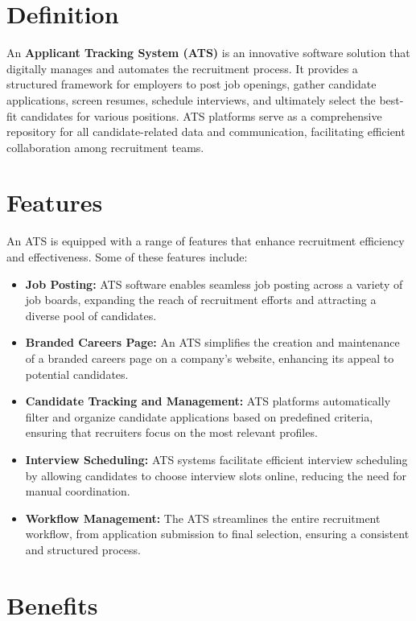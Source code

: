 \documentclass[
]{book}
\begin{document}
\hypertarget{definition}{%
\section{Definition}\label{definition}}

An \textbf{Applicant Tracking System (ATS)} is an innovative software solution that digitally manages and automates the recruitment process. It provides a structured framework for employers to post job openings, gather candidate applications, screen resumes, schedule interviews, and ultimately select the best-fit candidates for various positions. ATS platforms serve as a comprehensive repository for all candidate-related data and communication, facilitating efficient collaboration among recruitment teams.

\hypertarget{features}{%
\section{Features}\label{features}}

An ATS is equipped with a range of features that enhance recruitment efficiency and effectiveness. Some of these features include:

\begin{itemize}
\item
  \textbf{Job Posting:} ATS software enables seamless job posting across a variety of job boards, expanding the reach of recruitment efforts and attracting a diverse pool of candidates.
\item
  \textbf{Branded Careers Page:} An ATS simplifies the creation and maintenance of a branded careers page on a company's website, enhancing its appeal to potential candidates.
\item
  \textbf{Candidate Tracking and Management:} ATS platforms automatically filter and organize candidate applications based on predefined criteria, ensuring that recruiters focus on the most relevant profiles.
\item
  \textbf{Interview Scheduling:} ATS systems facilitate efficient interview scheduling by allowing candidates to choose interview slots online, reducing the need for manual coordination.
\item
  \textbf{Workflow Management:} The ATS streamlines the entire recruitment workflow, from application submission to final selection, ensuring a consistent and structured process.
\end{itemize}

\hypertarget{benefits}{%
\section{Benefits}\label{benefits}}
\end{document}
